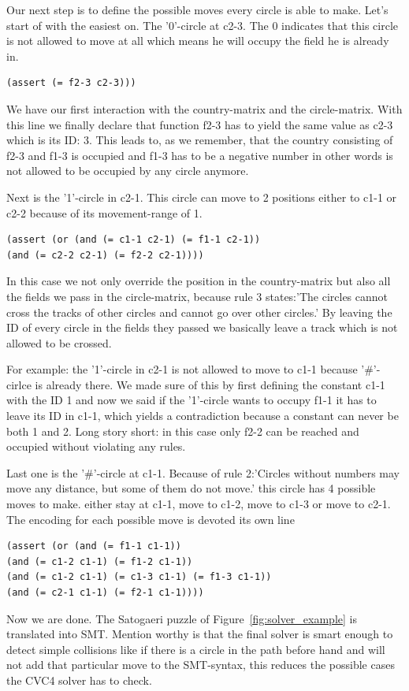 Our next step is to define the possible moves every circle is able to make. Let's start of with the easiest on. The '0'-circle at c2-3. The 0 indicates that this circle is not allowed to move at all which means he will occupy the field he is already in.
\begin{lstlisting}
(assert (= f2-3 c2-3)))
\end{lstlisting}
We have our first interaction with the country-matrix and the circle-matrix. With this line we finally declare that function f2-3 has to yield the same value as c2-3 which is its ID: 3. This leads to, as we remember, that the country consisting of f2-3 and f1-3 is occupied and f1-3 has to be a negative number in other words is not allowed to be occupied by any circle anymore.

Next is the '1'-circle in c2-1. This circle can move to 2 positions either to c1-1 or c2-2 because of its movement-range of 1.
\begin{lstlisting}
(assert (or (and (= c1-1 c2-1) (= f1-1 c2-1)) 
(and (= c2-2 c2-1) (= f2-2 c2-1))))
\end{lstlisting}
In this case we not only override the position in the country-matrix but also all the fields we pass in the circle-matrix, because rule 3 states:'The circles cannot cross the tracks of other circles and cannot go over other circles.' By leaving the ID of every circle in the fields they passed we basically leave a track which is not allowed to be crossed.

For example: the '1'-circle in c2-1 is not allowed to move to c1-1 because '\#'-cirlce is already there. We made sure of this by first defining the constant c1-1 with the ID 1 and now we said if the '1'-circle wants to occupy f1-1 it has to leave its ID in c1-1, which yields a contradiction because a constant can never be both 1 and 2.
Long story short: in this case only f2-2 can be reached and occupied without violating any rules.

Last one is the '\#'-circle at c1-1. Because of rule 2:'Circles without numbers may move any distance, but some of them do not move.' this circle has 4 possible moves to make. either stay at c1-1, move to c1-2, move to c1-3 or move to c2-1. The encoding for each possible move is devoted its own line
\begin{lstlisting}
(assert (or (and (= f1-1 c1-1)) 
(and (= c1-2 c1-1) (= f1-2 c1-1))
(and (= c1-2 c1-1) (= c1-3 c1-1) (= f1-3 c1-1)) 
(and (= c2-1 c1-1) (= f2-1 c1-1))))
\end{lstlisting}
Now we are done. The Satogaeri puzzle of Figure~\ref{fig:solver_example} is translated into SMT.
Mention worthy is that the final solver is smart enough to detect simple collisions like if there is a circle in the path before hand and will not add that particular move to the SMT-syntax, this reduces the possible cases the CVC4 solver has to check.

